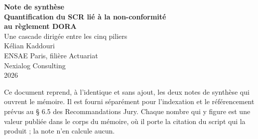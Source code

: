 \documentclass[12pt,a4paper]{report}
\begin{document}
\thispagestyle{empty}
\begin{center}
  {\large\bfseries Note de synthèse}\\[14pt]
  {\Large\bfseries Quantification du SCR lié à la non-conformité\\[3pt]
   au règlement DORA}\\[6pt]
  {\large Une cascade dirigée entre les cinq piliers}\\[22pt]
  {\large Kélian Kaddouri}\\[5pt]
  ENSAE Paris, filière Actuariat\\[3pt]
  Nexialog Consulting\\[3pt]
  2026
\end{center}

\vspace{16pt}
\noindent\hrulefill

\vspace{10pt}
\noindent\small Ce document reprend, à l'identique et sans ajout, les deux notes
de synthèse qui ouvrent le mémoire. Il est fourni séparément pour l'indexation et
le référencement prévus au § 6.5 des Recommandations Jury. Chaque nombre qui y
figure est une valeur publiée dans le corps du mémoire, où il porte la citation du
script qui la produit ; la note n'en calcule aucun.\normalsize

\clearpage


\end{document}
